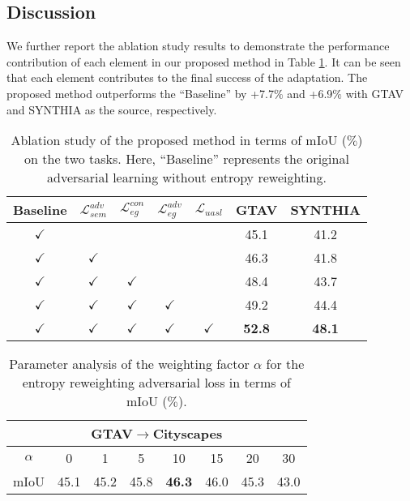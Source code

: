 \documentclass[sigconf]{acmart}
\begin{document}
\subsection{Discussion}
\par We further report the ablation study results to demonstrate the performance contribution of each element in our proposed method in Table \ref{tab:3}. It can be seen that each element contributes to the final success of the adaptation. The proposed method outperforms the “Baseline” by +7.7$\%$ and +6.9$\%$ with GTAV and SYNTHIA as the source, respectively.

\begin{table}[!t]
        \caption{Ablation study of the proposed method in terms of mIoU ($\%$) on the two tasks. Here, “Baseline” represents the original adversarial learning without entropy reweighting.}
        \centering
        \setlength\tabcolsep{3.4pt}
        \begin{tabular}{ccccc|cc}
        \toprule
        Baseline &   $\mathcal{L}_{sem}^{adv}$ & $\mathcal{L}_{eg}^{con}$ & $\mathcal{L}_{eg}^{adv}$ & $\mathcal{L}_{uasl}$ & GTAV&	SYNTHIA \\
        \hline
        $\checkmark$ &  & & & & 45.1&	41.2\\
        $\checkmark$  & $\checkmark$ &  & & & 46.3&	41.8\\
        $\checkmark$ & $\checkmark$  & $\checkmark$ & & &	48.4&	43.7\\
$\checkmark$ & $\checkmark$ & $\checkmark$ & $\checkmark$ &   &	49.2&	44.4\\
        $\checkmark$ & $\checkmark$& $\checkmark$&$\checkmark$ &$\checkmark$ &	\textbf{52.8}&	\textbf{48.1}\\
        \toprule
        \end{tabular}
        \label{tab:3}
\end{table}

\begin{table}
    \caption{Parameter analysis of the weighting factor $\alpha$ for the entropy reweighting adversarial loss in terms of mIoU ($\%$).}
    \centering
    \begin{tabular}{c c c c c c c c}
    \toprule
    \multicolumn{8}{c}{GTAV$\rightarrow$Cityscapes}\\
    \hline
    $\alpha$ & 0 & 1 & 5 & 10& 15 & 20 & 30  \\
    \hline
    mIoU & 45.1 & 45.2 & 45.8 & \textbf{46.3} & 46.0 & 45.3 & 43.0 \\  
    \toprule
    \end{tabular}
    \label{tab:4}
\end{table}
\end{document}
